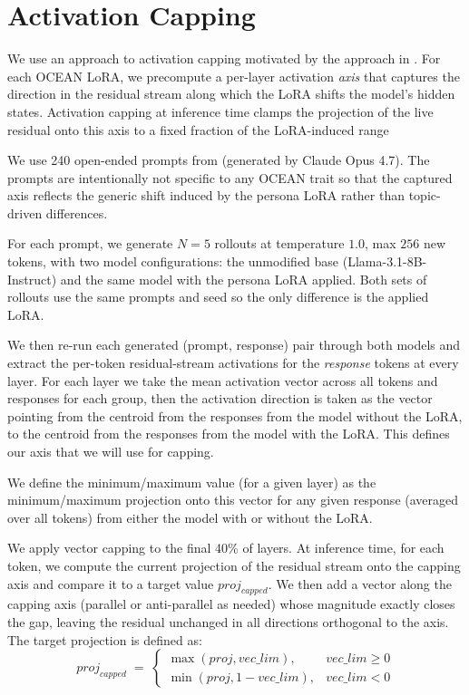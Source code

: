 \section{Activation Capping}\label{sec:activation_capping}

We use an approach to activation capping motivated by the approach in \citet{lu2026assistant}. For each OCEAN LoRA, we precompute a per-layer activation \emph{axis}
that captures the direction in the residual stream along which the LoRA
shifts the model's hidden states. Activation capping at inference time
clamps the projection of the live residual onto this axis to a fixed
fraction of the LoRA-induced range

We use 240 open-ended prompts from (generated by Claude Opus 4.7). The prompts are intentionally not specific to any OCEAN trait
so that the captured axis reflects the generic shift induced by the
persona LoRA rather than topic-driven differences.

For each prompt, we generate $N=5$ rollouts at
temperature $1.0$, max $256$ new tokens, with two model configurations:
the unmodified base (Llama-3.1-8B-Instruct) and the same model with the
persona LoRA applied. Both sets of rollouts use the same prompts and seed
so the only difference is the applied LoRA.

We then re-run each generated
(prompt, response) pair through both models and extract the per-token
residual-stream activations for the \emph{response} tokens at every
layer. For each layer we take the mean activation vector across all tokens and responses for each group, then the activation direction is taken as the vector pointing from the centroid from the responses from the model without the LoRA, to the centroid from the responses from the model with the LoRA. This defines our axis that we will use for capping.

We define the minimum/maximum value (for a given layer) as the minimum/maximum projection onto this vector for any given response (averaged over all tokens) from either the model with or without the LoRA.

We apply vector capping to the final 40\% of layers. At inference time, for each token, we compute the current projection of the residual stream onto the capping axis and compare it to a target value $proj_{capped}$. We then add a vector along the capping axis (parallel or anti-parallel as needed) whose magnitude exactly closes the gap, leaving the residual unchanged in all directions orthogonal to the axis. The target projection is defined as:
\[
  proj_{capped} \;=\;
  \begin{cases}
    \max(proj, vec\_lim), & vec\_lim \geq 0\\
    \min(proj, 1 - vec\_lim), & vec\_lim < 0
  \end{cases}
\]

